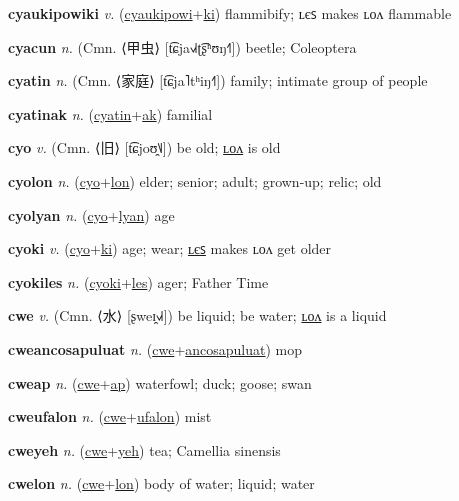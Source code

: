 \textbf{\hypertarget{cyaukipowiki}{cyaukipowiki}} \textit{v.} (\hyperlink{cyaukipowi}{cyaukipowi}+\allowbreak \hyperlink{ki}{ki})
flammibify; ʟєꜱ makes ʟᴏᴧ flammable

\textbf{\hypertarget{cyacun}{cyacun}} \textit{n.} (Cmn. ⟨{\chinese{}甲虫}⟩ [t͡ɕja˧˩˧ʈ͡ʂʰʊŋ˧˥])
beetle; Coleoptera

\textbf{\hypertarget{cyatin}{cyatin}} \textit{n.} (Cmn. ⟨{\chinese{}家庭}⟩ [t͡ɕja˥tʰiŋ˧˥])
family; intimate group of people

\textbf{\hypertarget{cyatinak}{cyatinak}} \textit{n.} (\hyperlink{cyatin}{cyatin}+\allowbreak \hyperlink{ak}{ak})
familial

\textbf{\hypertarget{cyo}{cyo}} \textit{v.} (Cmn. ⟨{\chinese{}旧}⟩ [t͡ɕjoʊ̯˥˩])
be old; \hyperlink{cyolon}{ʟᴏᴧ} is old

\textbf{\hypertarget{cyolon}{cyolon}} \textit{n.} (\hyperlink{cyo}{cyo}+\allowbreak \hyperlink{lon}{lon})
elder; senior; adult; grown-up; relic; old

\textbf{\hypertarget{cyolyan}{cyolyan}} \textit{n.} (\hyperlink{cyo}{cyo}+\allowbreak \hyperlink{lyan}{lyan})
age

\textbf{\hypertarget{cyoki}{cyoki}} \textit{v.} (\hyperlink{cyo}{cyo}+\allowbreak \hyperlink{ki}{ki})
age; wear; \hyperlink{cyokiles}{ʟєꜱ} makes ʟᴏᴧ get older

\textbf{\hypertarget{cyokiles}{cyokiles}} \textit{n.} (\hyperlink{cyoki}{cyoki}+\allowbreak \hyperlink{les}{les})
ager; Father Time

\textbf{\hypertarget{cwe}{cwe}} \textit{v.} (Cmn. ⟨{\chinese{}水}⟩ [ʂweɪ̯˧˩˧])
be liquid; be water; \hyperlink{cwelon}{ʟᴏᴧ} is a liquid

\textbf{\hypertarget{cweancosapuluat}{cweancosapuluat}} \textit{n.} (\hyperlink{cwe}{cwe}+\allowbreak \hyperlink{ancosapuluat}{ancosapuluat})
mop

\textbf{\hypertarget{cweap}{cweap}} \textit{n.} (\hyperlink{cwe}{cwe}+\allowbreak \hyperlink{ap}{ap})
waterfowl; duck; goose; swan

\textbf{\hypertarget{cweufalon}{cweufalon}} \textit{n.} (\hyperlink{cwe}{cwe}+\allowbreak \hyperlink{ufalon}{ufalon})
mist

\textbf{\hypertarget{cweyeh}{cweyeh}} \textit{n.} (\hyperlink{cwe}{cwe}+\allowbreak \hyperlink{yeh}{yeh})
tea; Camellia sinensis

\textbf{\hypertarget{cwelon}{cwelon}} \textit{n.} (\hyperlink{cwe}{cwe}+\allowbreak \hyperlink{lon}{lon})
body of water; liquid; water

